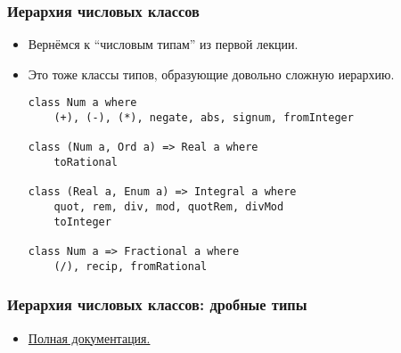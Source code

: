 \documentclass[10pt]{beamer}
\begin{document}
\begin{frame}[fragile]
\frametitle{Иерархия числовых классов}
\begin{itemize}
    \item Вернёмся к \enquote{числовым типам} из первой лекции.
    \item Это тоже классы типов, образующие довольно сложную иерархию.\pause
\begin{lstlisting}
class Num a where
    (+), (-), (*), negate, abs, signum, fromInteger

class (Num a, Ord a) => Real a where
    toRational
    
class (Real a, Enum a) => Integral a where
    quot, rem, div, mod, quotRem, divMod
    toInteger
    
class Num a => Fractional a where
    (/), recip, fromRational    
\end{lstlisting}
    
\end{itemize}
\end{frame}

\begin{frame}[fragile]
\frametitle{Иерархия числовых классов: дробные типы}
\begin{itemize}
\begin{lstlisting}[basicstyle=\ttfamily\small]
class Fractional a => Floating a where 
    exp, log, sqrt, (**), logBase, 
    pi, sin, cos, ...

class (Real a, Fractional a) => RealFrac a where 
    properFraction :: Integral b => a -> (b, a)
    truncate, round, ceiling, floor :: 
        Integral b => a -> b

class (RealFrac a, Floating a) => RealFloat a where
    isNaN, isInfinite :: a -> Bool
    ...
    
fromIntegral :: (Integral a, Num b) => a -> b
realToFrac :: (Real a, Fractional b) => a -> b
\end{lstlisting}
\item \href{http://hackage.haskell.org/package/base-4.10.1.0/docs/Prelude.html#g:6}{Полная документация.}
\end{itemize}
\end{frame}
\end{document}
